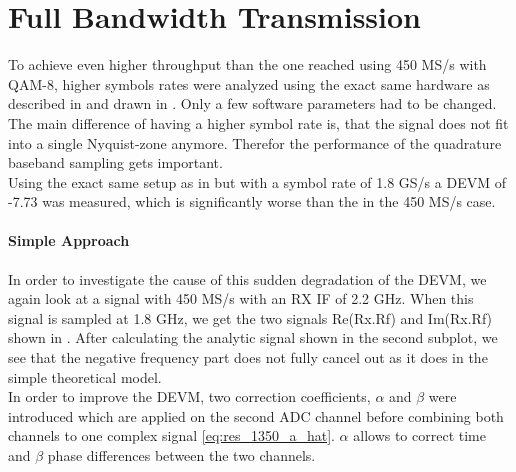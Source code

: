 \chapter{Full Bandwidth Transmission}
\label{chap:res_1350}

To achieve even higher throughput than the one reached using 450 MS/s with \gls{QAM}-8,
higher symbols rates were analyzed using the exact same hardware as described
in  and drawn in . Only a
few software parameters had to be changed. \\

The main difference of having a higher symbol rate is, that the signal does not
fit into a single Nyquist-zone anymore. Therefor the performance of the
quadrature baseband sampling gets important. \\

Using the exact same setup as in  but with a symbol rate
of 1.8 GS/s a \gls{DEVM} of -7.73 was measured, which is significantly
worse than the in the 450 MS/s case. \\

\subsubsection{Simple Approach}
In order to investigate the cause of this sudden degradation of the \gls{DEVM},
we again look at a signal with 450 MS/s with an \gls{RX} \gls{IF}
of 2.2 GHz. When this signal is sampled at 1.8 GHz, we get the two signals
Re(Rx.Rf) and Im(Rx.Rf) shown in .
After calculating the analytic signal shown in the second subplot,
we see that the negative frequency part does not fully cancel out
as it does in the simple theoretical model. \\

In order to improve the \acrfull{DEVM}, two correction coefficients, $\alpha$ and
$\beta$ were introduced which are applied on the second \gls{ADC} channel
before combining both channels to one complex signal \eqref{eq:res_1350_a_hat}.
$\alpha$ allows to correct time and $\beta$ phase differences between
the two channels. \\

